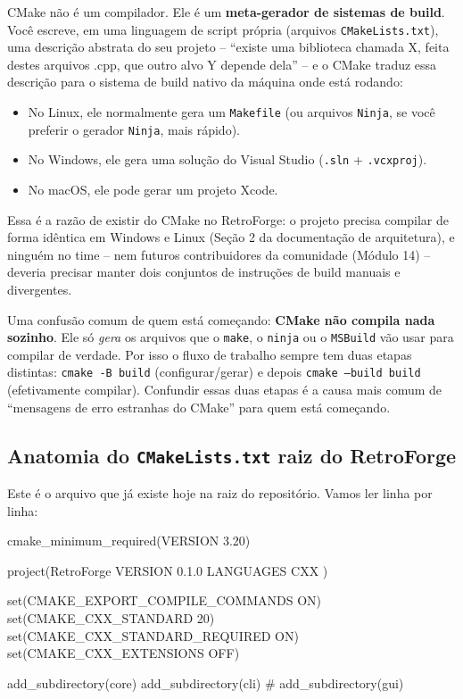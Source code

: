 CMake não é um compilador. Ele é um \textbf{meta-gerador de sistemas de build}. Você escreve, em uma linguagem de script própria (arquivos \texttt{CMakeLists.txt}), uma descrição abstrata do seu projeto -- ``existe uma biblioteca chamada X, feita destes arquivos .cpp, que outro alvo Y depende dela'' -- e o CMake traduz essa descrição para o sistema de build nativo da máquina onde está rodando:

\begin{itemize}
    \item No Linux, ele normalmente gera um \texttt{Makefile} (ou arquivos \texttt{Ninja}, se você preferir o gerador \texttt{Ninja}, mais rápido).
    \item No Windows, ele gera uma solução do Visual Studio (\texttt{.sln} + \texttt{.vcxproj}).
    \item No macOS, ele pode gerar um projeto Xcode.
\end{itemize}

Essa é a razão de existir do CMake no RetroForge: o projeto precisa compilar de forma idêntica em Windows e Linux (Seção 2 da documentação de arquitetura), e ninguém no time -- nem futuros contribuidores da comunidade (Módulo 14) -- deveria precisar manter dois conjuntos de instruções de build manuais e divergentes.

\begin{CaixaAlerta}
Uma confusão comum de quem está começando: \textbf{CMake não compila nada sozinho}. Ele só \textit{gera} os arquivos que o \texttt{make}, o \texttt{ninja} ou o \texttt{MSBuild} vão usar para compilar de verdade. Por isso o fluxo de trabalho sempre tem duas etapas distintas: \texttt{cmake -B build} (configurar/gerar) e depois \texttt{cmake --build build} (efetivamente compilar). Confundir essas duas etapas é a causa mais comum de ``mensagens de erro estranhas do CMake'' para quem está começando.
\end{CaixaAlerta}

\subsection{Anatomia do \texttt{CMakeLists.txt} raiz do RetroForge}

Este é o arquivo que já existe hoje na raiz do repositório. Vamos ler linha por linha:

\begin{CaixaCodigo}
cmake_minimum_required(VERSION 3.20)

project(RetroForge
    VERSION 0.1.0
    LANGUAGES CXX
)

set(CMAKE_EXPORT_COMPILE_COMMANDS ON)
set(CMAKE_CXX_STANDARD 20)
set(CMAKE_CXX_STANDARD_REQUIRED ON)
set(CMAKE_CXX_EXTENSIONS OFF)

add_subdirectory(core)
add_subdirectory(cli)
# add_subdirectory(gui)
\end{CaixaCodigo}

